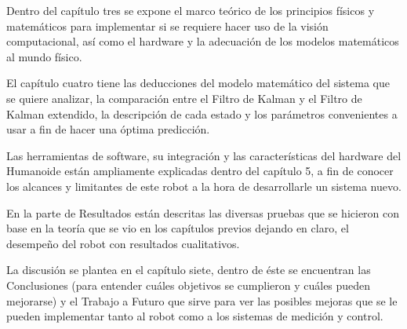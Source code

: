 	Dentro del capítulo tres se expone el marco teórico de los principios físicos y matemáticos para implementar si se requiere hacer uso de la visión computacional, así como el hardware y la adecuación de los modelos matemáticos al mundo físico.
	
	El capítulo cuatro tiene las deducciones del modelo matemático del sistema que se quiere analizar, la comparación entre el Filtro de Kalman y el Filtro de Kalman extendido, la descripción de cada estado y los parámetros convenientes a usar a fin de hacer una óptima predicción.
	
	Las herramientas de software, su integración y las características del hardware del Humanoide están ampliamente explicadas dentro del capítulo 5, a fin de conocer los alcances y limitantes de este robot a la hora de desarrollarle un sistema nuevo.
	
	En la parte de Resultados están descritas las diversas pruebas que se hicieron con base en la teoría que se vio en los capítulos previos dejando en claro, el desempeño del robot con resultados cualitativos.
	
	La discusión se plantea en el capítulo siete, dentro de éste se encuentran las Conclusiones (para entender cuáles objetivos se cumplieron y cuáles pueden mejorarse) y el Trabajo a Futuro que sirve para ver las posibles mejoras que se le pueden implementar tanto al robot como a los sistemas de medición y control.